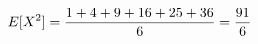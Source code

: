 \documentclass[preview]{standalone}
\begin{document}
\begin{align*}
\special{dvisvgm:raw <g id='unique000'>}E[X^2]=\dfrac{1+4+9+16+25+36}{6}=\dfrac{91}{6}\special{dvisvgm:raw </g>}
\end{align*}
\end{document}
